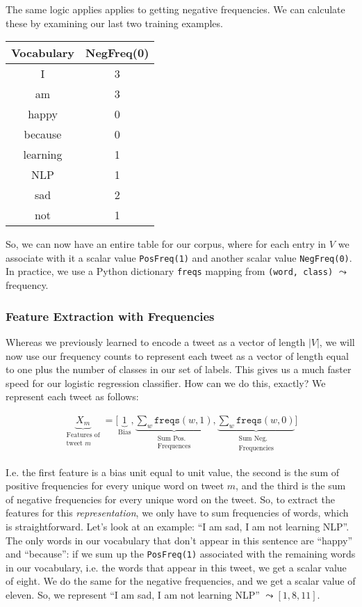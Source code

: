 \documentclass[12pt]{article}
\begin{document}
The same logic applies applies to getting negative frequencies. We can calculate these by examining our last two training examples.


\begin{center}
  \begin{tabular}{c c}
    \hline
    Vocabulary & NegFreq(0) \\
    \hline
    I  & 3 \\
    am & 3 \\
    happy & 0 \\
    because & 0 \\
    learning & 1 \\
    NLP & 1 \\
    sad & 2 \\
    not & 1
  \end{tabular}
\end{center}

So, we can now have an entire table for our corpus, where for each entry in $V$ we associate with it a scalar value \texttt{PosFreq(1)} and another scalar value \texttt{NegFreq(0)}. In practice, we use a Python dictionary \texttt{freqs} mapping from \texttt{(word, class)} $\leadsto$ frequency.

\subsubsection{Feature Extraction with Frequencies} Whereas we previously learned to encode a tweet as a vector of length $|V|$, we will now use our frequency counts to represent each tweet as a vector of length equal to one plus the number of classes in our set of labels. This gives us a much faster speed for our logistic regression classifier. How can we do this, exactly? We represent each tweet as follows:

\begin{align*}
\underbrace{X_m}_{\substack{\textrm{Features of} \\ \textrm{tweet } m}} = \bigg [ \underbrace{1}_{\textrm{Bias}}, \underbrace{\sum_w \texttt{freqs}(w, 1)}_{\substack{\textrm{Sum Pos.} \\ \textrm{Frequences}}}, \underbrace{\sum_w \texttt{freqs}(w, 0)}_{\substack{\textrm{Sum Neg.} \\ \textrm{Frequencies}}} \bigg ]
\end{align*}

I.e. the first feature is a bias unit equal to unit value, the second is the sum of positive frequencies for every unique word on tweet $m$, and the third is the sum of negative frequencies for every unique word on the tweet.
So, to extract the features for this \emph{representation}, we only have to sum frequencies of words, which is straightforward. Let's look at an example: ``I am sad, I am not learning NLP''. The only words in our vocabulary that don't appear in this sentence are ``happy'' and ``because'': if we sum up the \texttt{PosFreq(1)} associated with the remaining words in our vocabulary, i.e. the words that appear in this tweet, we get a scalar value of eight. We do the same for the negative frequencies, and we get a scalar value of eleven. So, we represent ``I am sad, I am not learning NLP'' $\leadsto [1, 8, 11]$.
\end{document}
